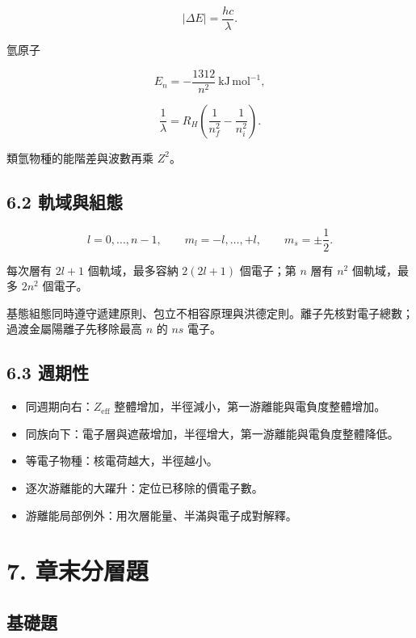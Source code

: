 \documentclass[11pt,a4paper]{article}
\providecommand{\tightlist}{%
  \setlength{\itemsep}{0pt}\setlength{\parskip}{0pt}}
\begin{document}
\[
|\Delta E|=\frac{hc}{\lambda}.
\]

氫原子

\[
E_n=-\frac{1312}{n^2}\ \mathrm{kJ\,mol^{-1}},
\]

\[
\frac1\lambda
=R_H\left(\frac1{n_f^2}-\frac1{n_i^2}\right).
\]

類氫物種的能階差與波數再乘 \(Z^2\)。

\subsection{6.2 軌域與組態}\label{ux8eccux57dfux8207ux7d44ux614b}

\[
l=0,\ldots,n-1,
\qquad
m_l=-l,\ldots,+l,
\qquad
m_s=\pm\frac12.
\]

每次層有 \(2l+1\) 個軌域，最多容納 \(2(2l+1)\) 個電子；第 \(n\) 層有 \(n^2\) 個軌域，最多 \(2n^2\) 個電子。

基態組態同時遵守遞建原則、包立不相容原理與洪德定則。離子先核對電子總數；過渡金屬陽離子先移除最高 \(n\) 的 \(ns\) 電子。

\subsection{6.3 週期性}\label{ux9031ux671fux6027}

\begin{itemize}
\tightlist
\item
  同週期向右：\(Z_{\mathrm{eff}}\) 整體增加，半徑減小，第一游離能與電負度整體增加。
\item
  同族向下：電子層與遮蔽增加，半徑增大，第一游離能與電負度整體降低。
\item
  等電子物種：核電荷越大，半徑越小。
\item
  逐次游離能的大躍升：定位已移除的價電子數。
\item
  游離能局部例外：用次層能量、半滿與電子成對解釋。
\end{itemize}

\section{7. 章末分層題}\label{ux7ae0ux672bux5206ux5c64ux984c}

\subsection{基礎題}\label{ux57faux790eux984c}
\end{document}
